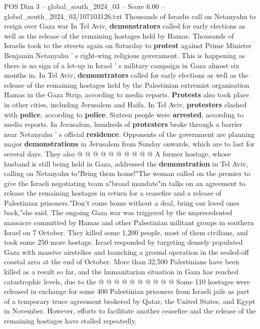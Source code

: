 \begin{textsample}{POS Dim 3 – global\_south\_2024\_03 – Score 6.00 – global\_south\_2024\_03/107103126.txt}  \label{ex:f3_pos_417}
Thousands of Israelis call on Netanyahu to resign over Gaza war In Tel Aviv, \textbf{demonstrators} called for early elections as well as the release of the remaining hostages held by Hamas.
Thousands of Israelis took to the streets again on Saturday to \textbf{protest} against Prime Minister Benjamin Netanyahu ' s right-wing religious government.
This is happening as there is no sign of a let-up in Israel ' s military campaign in Gaza almost six months in.
In Tel Aviv, \textbf{demonstrators} called for early elections as well as the release of the remaining hostages held by the Palestinian extremist organisation Hamas in the Gaza Strip, according to media reports. \textbf{Protests} also took place in other cities, including Jerusalem and Haifa.
In Tel Aviv, \textbf{protesters} clashed with \textbf{police}, according to \textbf{police}.
Sixteen people were \textbf{arrested}, according to media reports.
In Jerusalem, hundreds of \textbf{protesters} broke through a barrier near Netanyahu ' s official \textbf{residence}.
Opponents of the government are planning major \textbf{demonstrations} in Jerusalem from Sunday onwards, which are to last for several days.
They also @ @ @ @ @ @ @ @ @ @ A former hostage, whose husband is still being held in Gaza, addressed the \textbf{demonstration} in Tel Aviv, calling on Netanyahu to"Bring them home!"The woman called on the premier to give the Israeli negotiating team a"broad mandate"in talks on an agreement to release the remaining hostages in return for a ceasefire and a release of Palestinian prisoners."Don't come home without a deal, bring our loved ones back,"she said.
The ongoing Gaza war was triggered by the unprecedented massacre committed by Hamas and other Palestinian militant groups in southern Israel on 7 October.
They killed some 1,200 people, most of them civilians, and took some 250 more hostage.
Israel responded by targeting densely populated Gaza with massive airstrikes and launching a ground operation in the sealed-off coastal area at the end of October.
More than 32,500 Palestinians have been killed as a result so far, and the humanitarian situation in Gaza has reached catastrophic levels, due to the @ @ @ @ @ @ @ @ @ @ Some 110 hostages were released in exchange for some 400 Palestinian prisoners from Israeli jails as part of a temporary truce agreement brokered by Qatar, the United States, and Egypt in November.
However, efforts to facilitate another ceasefire and the release of the remaining hostages have stalled repeatedly.

\end{textsample}
